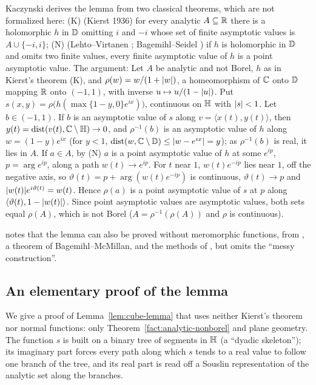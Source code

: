 \begin{remark}
Kaczynski derives the lemma from two classical theorems, which are not formalized here:
(K) (Kierst 1936) for every analytic $A\subseteq\mathbb{R}$ there is a holomorphic $h$ in $\mathbb{D}$ omitting $i$ and $-i$ whose set of finite
asymptotic values is $A\cup\{-i,i\}$; (N) (Lehto--Virtanen \cite[p.~53]{LV}; Bagemihl--Seidel \cite[Theorem 1]{BS}) if $h$ is
holomorphic in $\mathbb{D}$ and omits two finite values, every finite asymptotic value of $h$ is a point asymptotic value. The argument:
Let $A$ be analytic and not Borel, $h$ as in Kierst's theorem (K), and $\rho(w)=w/(1+\lvert w\rvert)$, a homeomorphism of $\mathbb{C}$ onto $\mathbb{D}$ mapping
$\mathbb{R}$ onto $(-1,1)$, with inverse $u\mapsto u/(1-\lvert u\rvert)$. Put $s(x,y)=\rho\bigl(h(\max\{1-y,0\}e^{ix})\bigr)$, continuous on $\mathbb{H}$
with $\lvert s\rvert<1$. Let $b\in(-1,1)$. If $b$ is an asymptotic value of $s$ along $v=\langle x(t),y(t)\rangle$, then $y(t)=\operatorname{dist}(v(t),\mathbb{C}\setminus\mathbb{H})\to0$, and
$\rho^{-1}(b)$ is an asymptotic value of $h$ along $w=(1-y)e^{ix}$ (for $y<1$, $\operatorname{dist}(w,\mathbb{C}\setminus\mathbb{D})\le\lvert w-e^{ix}\rvert=y$); as $\rho^{-1}(b)$ is real,
it lies in $A$. If $a\in A$, by (N) $a$ is a point asymptotic value of $h$ at some $e^{ip}$, $p=\arg e^{ip}$, along a path
$w(t)\to e^{ip}$. For $t$ near $1$, $w(t)e^{-ip}$ lies near $1$, off the negative axis, so $\vartheta(t)=p+\arg(w(t)e^{-ip})$ is continuous,
$\vartheta(t)\to p$ and $\lvert w(t)\rvert e^{i\vartheta(t)}=w(t)$. Hence $\rho(a)$ is a point asymptotic value of $s$ at $p$ along
$\langle\vartheta(t),1-\lvert w(t)\rvert\rangle$. Since point asymptotic values are asymptotic values, both sets equal $\rho(A)$, which is not Borel
($A=\rho^{-1}(\rho(A))$ and $\rho$ is continuous).
\end{remark}

\begin{remark}
\cite{PAMS} notes that the lemma can also be proved without meromorphic functions, from \cite[Theorem 113]{SierpGT}, a theorem of
Bagemihl--McMillan, and the methods of \cite{TAMSb}, but omits the ``messy construction''.
\end{remark}

\subsection*{An elementary proof of the lemma}
We give a proof of Lemma~\ref{lem:cube-lemma} that uses neither Kierst's theorem nor normal functions: only
Theorem~\ref{fact:analytic-nonborel} and plane geometry. The function $s$ is built on a binary tree of segments in $\mathbb{H}$
(a ``dyadic skeleton''); its imaginary part forces every path along which $s$ tends to a real value to follow one branch of the
tree, and its real part is read off a Souslin representation of the analytic set along the branches.

